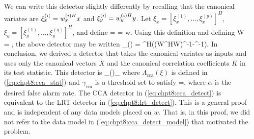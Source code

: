 We can write this detector slightly differently by recalling that the
canonical variates are $\xi_x^{(i)}=w_x^{(i)H}x$ and $\xi_y^{(i)}=w_y^{(i)H}y$. Let
$\xi_x=\left[\xi_x^{(1)},\dots,\xi_x^{(p)}\right]^H$,
$\xi_y=\left[\xi_y^{(1)},\dots,\xi_y^{(q)}\right]^H$, and define
\be 
\xi = \left[\begin{array}{c}\xi_x \\ \xi_y\end{array}\right] =
\left[\begin{array}{cc}W_x^H & 0 \\ 0 & W_y^H\end{array}\right]w. 
\ee
Using this definition and defining
\be
W = \left[\begin{array}{cc}W_x & 0 \\ 0 & W_y\end{array}\right],
\ee
the above detector may be written
\beq\label{eq:chpt8:cca_stat}
\Lambda_{}(\xi) = \xi^H\left(\left(W^HW\right)^{-1}-\left[\begin{array}{cc}
    I_{p} & K \\ K^H & I_{q}
\end{array}\right]^{-1}\right)\xi.
\eeq
In conclusion, we derived a detector that takes the canonical variates as
inputs and uses only the canonical vectors $X$ and the canonical correlation coefficients
$K$ in its test statistic. This detector is
\beq\label{eq:chpt8:cca_detect}
\Lambda_{}(\xi)\detgtrless\gamma_{}
\eeq
where $\Lambda_{\text{cca}}(\xi)$ is defined in (\ref{eq:chpt8:cca_stat}) and
$\gamma_{\text{cca}}$ is a threshold set to satisfy
\be
{}=\alpha,
\ee
where $\alpha$ is the desired false alarm rate. The CCA detector in (\ref{eq:chpt8:cca_detect})
is equivalent to the LRT detector in (\ref{eq:chpt8:lrt_detect}). This is a general proof and is
independent of any data models placed on $w$. That is, in this proof, we did not refer to
the data model in (\ref{eq:chpt8:cca_detect_model}) that motivated the problem.

